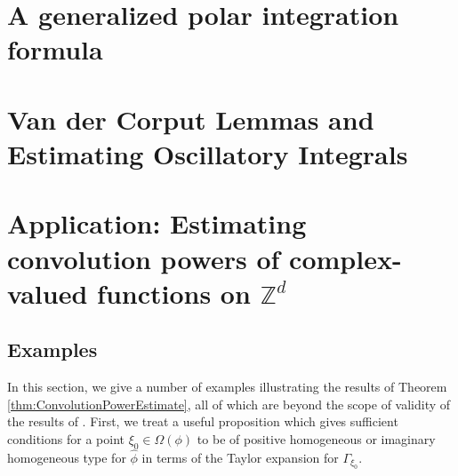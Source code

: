 \documentclass[11pt, letter]{book}
\begin{document}
\chapter{A generalized polar integration formula}\label{chap:formula}




\chapter{Van der Corput Lemmas and Estimating Oscillatory Integrals}\label{chap:VanDerCorput}
















\chapter{Application: Estimating convolution powers of complex-valued functions on $\mathbb{Z}^d$}
\label{chap:Estimate-ConvPwr}











\section{Examples}\label{sec:Examples}



In this section, we give a number of examples illustrating the results of Theorem \ref{thm:ConvolutionPowerEstimate}, all of which are beyond the scope of validity of the results of \cite{randles_convolution_2017}. First, we treat a useful proposition which gives sufficient conditions for a point $\xi_0\in\Omega(\phi)$ to be of positive homogeneous or imaginary homogeneous type for $\hat{\phi}$ in terms of the Taylor expansion for $\Gamma_{\xi_0}$.
\end{document}
